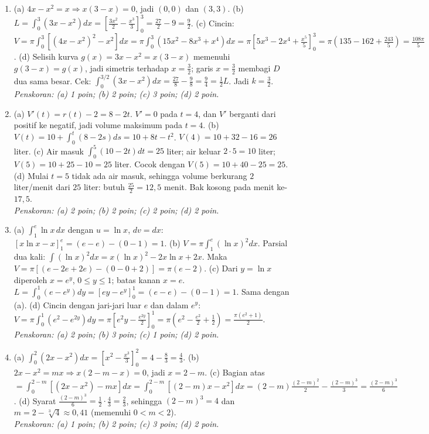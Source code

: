 \documentclass[a4paper,11pt]{article}
\begin{document}
\small\begin{enumerate}[leftmargin=2em,itemsep=3pt,topsep=2pt]
\item[\textbf{1.}] (a) $4x-x^2=x\Rightarrow x(3-x)=0$, jadi $(0,0)$ dan $(3,3)$. (b) $L=\int_0^3(3x-x^2)dx=\left[\frac{3x^2}{2}-\frac{x^3}{3}\right]_0^3=\frac{27}{2}-9=\frac92$. (c) Cincin: $V=\pi\int_0^3\left[(4x-x^2)^2-x^2\right]dx=\pi\int_0^3(15x^2-8x^3+x^4)dx=\pi\left[5x^3-2x^4+\frac{x^5}{5}\right]_0^3=\pi\left(135-162+\frac{243}{5}\right)=\frac{108\pi}{5}$. (d) Selisih kurva $g(x)=3x-x^2=x(3-x)$ memenuhi $g(3-x)=g(x)$, jadi simetris terhadap $x=\frac32$; garis $x=\frac32$ membagi $D$ dua sama besar. Cek: $\int_0^{3/2}(3x-x^2)dx=\frac{27}{8}-\frac98=\frac94=\frac12L$. Jadi $k=\frac32$. \\ \textit{Penskoran: (a) 1 poin; (b) 2 poin; (c) 3 poin; (d) 2 poin.}
\item[\textbf{2.}] (a) $V'(t)=r(t)-2=8-2t$. $V'=0$ pada $t=4$, dan $V'$ berganti dari positif ke negatif, jadi volume maksimum pada $t=4$. (b) $V(t)=10+\int_0^t(8-2s)ds=10+8t-t^2$. $V(4)=10+32-16=26$ liter. (c) Air masuk $\int_0^5(10-2t)dt=25$ liter; air keluar $2\cdot5=10$ liter; $V(5)=10+25-10=25$ liter. Cocok dengan $V(5)=10+40-25=25$. (d) Mulai $t=5$ tidak ada air masuk, sehingga volume berkurang $2$ liter/menit dari $25$ liter: butuh $\frac{25}{2}=12{,}5$ menit. Bak kosong pada menit ke-$17{,}5$. \\ \textit{Penskoran: (a) 2 poin; (b) 2 poin; (c) 2 poin; (d) 2 poin.}
\item[\textbf{3.}] (a) $\int_1^e\ln x\,dx$ dengan $u=\ln x$, $dv=dx$: $\left[x\ln x-x\right]_1^e=(e-e)-(0-1)=1$. (b) $V=\pi\int_1^e(\ln x)^2dx$. Parsial dua kali: $\int(\ln x)^2dx=x(\ln x)^2-2x\ln x+2x$. Maka $V=\pi\left[(e-2e+2e)-(0-0+2)\right]=\pi(e-2)$. (c) Dari $y=\ln x$ diperoleh $x=e^y$, $0\le y\le1$; batas kanan $x=e$. $L=\int_0^1(e-e^y)dy=\left[ey-e^y\right]_0^1=(e-e)-(0-1)=1$. Sama dengan (a). (d) Cincin dengan jari-jari luar $e$ dan dalam $e^y$: $V=\pi\int_0^1\left(e^2-e^{2y}\right)dy=\pi\left[e^2y-\frac{e^{2y}}{2}\right]_0^1=\pi\left(e^2-\frac{e^2}{2}+\frac12\right)=\frac{\pi(e^2+1)}{2}$. \\ \textit{Penskoran: (a) 2 poin; (b) 3 poin; (c) 1 poin; (d) 2 poin.}
\item[\textbf{4.}] (a) $\int_0^2(2x-x^2)dx=\left[x^2-\frac{x^3}{3}\right]_0^2=4-\frac83=\frac43$. (b) $2x-x^2=mx\Rightarrow x(2-m-x)=0$, jadi $x=2-m$. (c) Bagian atas $=\int_0^{2-m}\left[(2x-x^2)-mx\right]dx=\int_0^{2-m}\left[(2-m)x-x^2\right]dx=(2-m)\frac{(2-m)^2}{2}-\frac{(2-m)^3}{3}=\frac{(2-m)^3}{6}$. (d) Syarat $\frac{(2-m)^3}{6}=\frac12\cdot\frac43=\frac23$, sehingga $(2-m)^3=4$ dan $m=2-\sqrt[3]4\approx0{,}41$ (memenuhi $0<m<2$). \\ \textit{Penskoran: (a) 1 poin; (b) 2 poin; (c) 3 poin; (d) 2 poin.}

\end{enumerate}
\end{document}
